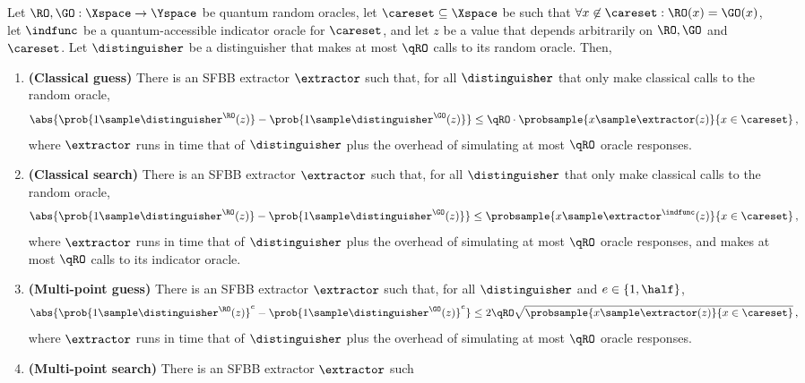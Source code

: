     \begin{lemma}
      Let $\RO, \GO: \Xspace \to \Yspace$
      be quantum random oracles, let $\careset \subseteq \Xspace$ be such that
      $\forall x \not\in \careset: \RO(x) = \GO(x)$, let $\indfunc$ be a
      quantum-accessible indicator oracle for $\careset$, and let $z$ be a value
      that depends arbitrarily on $\RO, \GO$ and $\careset$.
      Let $\distinguisher$ be a distinguisher that makes at most $\qRO$ calls to
      its random oracle. Then,
      \begin{enumerate}
        \item \textbf{(Classical guess)} There is an SFBB extractor $\extractor$ such that, for all $\distinguisher$ that only
          make classical calls to the random oracle, 
          \[
            \abs{
              \prob{1 \sample \distinguisher^{\RO}(z)} - \prob{1 \sample \distinguisher^{\GO}(z)}
            } \leq \qRO \cdot \probsample{x \sample \extractor(z)}{x \in \careset}\, ,
          \]
          where $\extractor$ runs in time that of $\distinguisher$ plus the
          overhead of simulating at most $\qRO$ oracle responses.
        \item \textbf{(Classical search)} There is an SFBB extractor $\extractor$ such that, for all $\distinguisher$ that only
          make classical calls to the random oracle, 
          \[
            \abs{
              \prob{1 \sample \distinguisher^{\RO}(z)} - \prob{1 \sample \distinguisher^{\GO}(z)}
            } \leq \probsample{x \sample \extractor^{\indfunc}(z)}{x \in \careset}\, ,
          \]
          where $\extractor$ runs in time that of $\distinguisher$ plus the
          overhead of simulating at most $\qRO$ oracle responses,
          and makes at most $\qRO$ calls to its indicator oracle.
        \item \textbf{(Multi-point guess)} There is an SFBB extractor $\extractor$ such
          that, for all $\distinguisher$ and $e \in \{1, \half\}$,
          \[
            \abs{
              \prob{1 \sample \distinguisher^{\RO}(z)}^e - \prob{1 \sample \distinguisher^{\GO}(z)}^e
            } \leq 2 \qRO \sqrt{
              \probsample{x \sample \extractor(z)}{x \in \careset}
            }\, ,
          \]
          where $\extractor$ runs in time that of $\distinguisher$ plus the
          overhead of simulating at most $\qRO$ oracle responses.
        \item \textbf{(Multi-point search)} There is an SFBB extractor $\extractor$ such

\end{enumerate}
\end{lemma}
